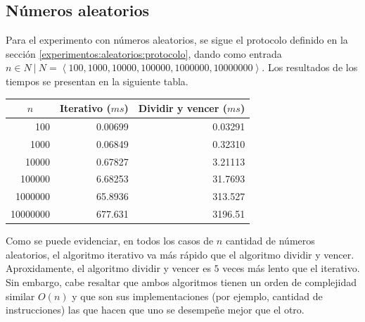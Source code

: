 \documentclass[letter]{article}
\begin{document}
\subsection{Números aleatorios}

Para el experimento con números aleatorios, se sigue el protocolo definido en la sección \ref{experimentos:aleatorios:protocolo}, dando como entrada $n \in N ~|~ N = \left< 100, 1000, 10000, 100000, 1000000, 10000000 \right>$. Los resultados de los tiempos se presentan en la siguiente tabla. \par

\begin{table}[ht!]
\centering
\begin{tabular}{|r|r|r|}
\hline
\multicolumn{1}{|c|}{$n$} & \multicolumn{1}{c|}{Iterativo ($ms$)} & \multicolumn{1}{c|}{Dividir y vencer ($ms$)} \\ \hline
100                       & 0.00699                               & 0.03291                                      \\ \hline
1000                      & 0.06849                               & 0.32310                                      \\ \hline
10000                     & 0.67827                               & 3.21113                                      \\ \hline
100000                    & 6.68253                               & 31.7693                                      \\ \hline
1000000                   & 65.8936                               & 313.527                                      \\ \hline
10000000                  & 677.631                               & 3196.51                                      \\ \hline
\end{tabular}
\end{table}

Como se puede evidenciar, en todos los casos de $n$ cantidad de números aleatorios, el algoritmo iterativo va más rápido que el algoritmo dividir y vencer. Aproxidamente, el algoritmo dividir y vencer es $5$ veces más lento que el iterativo. Sin embargo, cabe resaltar que ambos algoritmos tienen un orden de complejidad similar $O(n)$ y que son sus implementaciones (por ejemplo, cantidad de instrucciones) las que hacen que uno se desempeñe mejor que el otro. \par
\end{document}
